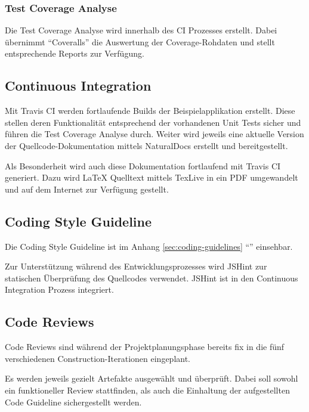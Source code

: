 \subsubsection*{Test Coverage Analyse}
Die Test Coverage Analyse wird innerhalb des CI Prozesses erstellt. Dabei übernimmt ``Coveralls'' \cite{Coveralls} die Auswertung der Coverage-Rohdaten und stellt entsprechende Reports zur Verfügung.

\subsection{Continuous Integration}
\label{sec:continuousintegration}

Mit Travis CI \cite{TravisCI} werden fortlaufende Builds der Beispielapplikation erstellt. Diese stellen deren Funktionalität entsprechend der vorhandenen Unit Tests sicher und führen die Test Coverage Analyse durch.
Weiter wird jeweils eine aktuelle Version der Quellcode-Dokumentation mittels NaturalDocs erstellt und bereitgestellt.

Als Besonderheit wird auch diese Dokumentation fortlaufend mit Travis CI generiert. Dazu wird LaTeX Quelltext mittels TexLive in ein PDF umgewandelt und auf dem Internet zur Verfügung gestellt.

\subsection{Coding Style Guideline}
Die Coding Style Guideline ist im Anhang \ref{sec:coding-guidelines} ``'' einsehbar.

Zur Unterstützung während des Entwicklungsprozesses wird JSHint \cite{JSHint} zur statischen Überprüfung des Quellcodes verwendet. JSHint ist in den Continuous Integration Prozess integriert.

\subsection{Code Reviews}
Code Reviews sind während der Projektplanungsphase bereits fix in die fünf verschiedenen Construction-Iterationen eingeplant.

Es werden jeweils gezielt Artefakte ausgewählt und überprüft. Dabei soll sowohl ein funktioneller Review stattfinden, als auch die Einhaltung der aufgestellten Code Guideline sichergestellt werden.